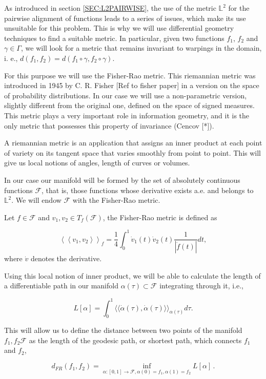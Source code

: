 As introduced in section \ref{SEC:L2PAIRWISE}, the use of the metric $\mathbb{L}^2$
for the pairwise alignment of functions leads to a series of issues, which make
its use unsuitable for this problem. This is why we will use differential
geometry techniques to find a suitable metric. In particular, given two
functions $f_1$, $f_2$ and $\gamma \in \Gamma$, we will look for a metric that
remains invariant to warpings in the domain, i. e.,
$d(f_1, f_2) = d(f_1 \circ \gamma, f_2 \circ \gamma)$.

For this purpose we will use the Fisher-Rao metric. This riemannian metric was
introduced in 1945 by C. R. Fisher [Ref to fisher paper] in a version on the
space of probability distributions. In our case we will use a non-parametric
version, slightly different from the original one, defined on the space of
signed measures. This metric plays a very important role in information
geometry, and it is the only metric that possesses this property of
invariance (Cencov [*]).

A riemannian metric is an application that assigns an inner product at each
point of variety on its tangent space that varies smoothly from point to point.
This will give us local notions of angles, length of curves or volumes.

In our case our manifold will be formed by the set of absolutely continuous
functions $\mathcal{F}$, that is, those functions whose derivative exists a.e.
and belongs to $\mathbb{L}^2$. We will endow $\mathcal{F}$ with the
Fisher-Rao metric.

Let $f \in \mathcal{F}$  and $v_{1}, v_{2} \in T_{f}(\mathcal{F})$,
the Fisher-Rao metric is defined as

$$
\left\langle\left\langle v_{1}, v_{2}\right\rangle\right\rangle_{f}=
\frac{1}{4} \int_{0}^{1} \dot{v}_{1}(t) \dot{v}_{2}(t) \frac{1}{|\dot{f}(t)|}dt,
$$
where $\dot v$ denotes the derivative.

Using this local notion of inner product, we will be able to calculate the
length of a differentiable path in our manifold
$\alpha(\tau) \subset \mathcal{F}$ integrating through it, i.e.,

$$
L[\alpha] = \int_0^1 \langle \langle \dot \alpha(\tau), \dot \alpha(\tau)
\rangle \rangle_{\alpha(\tau)} d\tau.
$$

This will allow us to define the distance between two points of the
manifold $f_1, f_2 \mathcal{F}$ as the length of the geodesic path, or shortest
path, which connects $f_1$ and $f_2$,

$$
d_{F R}\left(f_{1}, f_{2}\right)=\inf _{\alpha :[0,1]
\rightarrow \mathcal{F}, \alpha(0)=f_{1}, \alpha(1)=f_{2}} L[\alpha] \, .
$$

